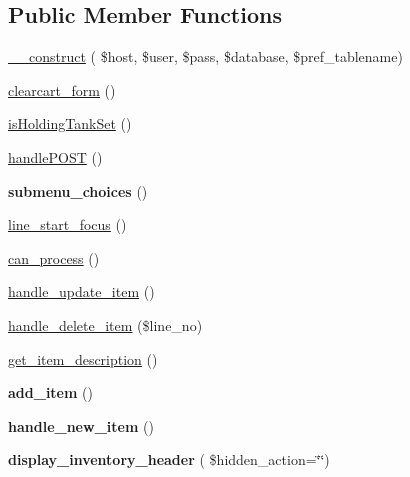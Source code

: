 \subsection*{Public Member Functions}
\begin{DoxyCompactItemize}
\item 
\hyperlink{class_inventory__ui_a903fc6b7eb51afa2c4f6c1392783973d}{\+\_\+\+\_\+construct} ( \$host, \$user, \$pass, \$database, \$pref\+\_\+tablename)
\item 
\hyperlink{class_inventory__ui_a107e020384575635892dd82bf07a5e46}{clearcart\+\_\+form} ()
\item 
\hyperlink{class_inventory__ui_aaa3f36bec8fb25199f697bf1983864aa}{is\+Holding\+Tank\+Set} ()
\item 
\hyperlink{class_inventory__ui_a0bdd5eda22187fd5ed67fc9b03edbbba}{handle\+P\+O\+ST} ()
\item 
\hypertarget{class_inventory__ui_ad89a4d653f5839e27c355aba1098aa8f}{}\label{class_inventory__ui_ad89a4d653f5839e27c355aba1098aa8f} 
{\bfseries submenu\+\_\+choices} ()
\item 
\hyperlink{class_inventory__ui_a5f2b542e69b9b6c8fe66d6ca513532f4}{line\+\_\+start\+\_\+focus} ()
\item 
\hyperlink{class_inventory__ui_ade75d16c1775ae3c2c40b3ac9ad6339f}{can\+\_\+process} ()
\item 
\hyperlink{class_inventory__ui_abd5a2b4048e33b9c1518db7c44115f4f}{handle\+\_\+update\+\_\+item} ()
\item 
\hyperlink{class_inventory__ui_aaa12492aec2f41782ca4467e2d0bb8c1}{handle\+\_\+delete\+\_\+item} (\$line\+\_\+no)
\item 
\hyperlink{class_inventory__ui_a37a17c8d4b2d63c774dc3404754df4f4}{get\+\_\+item\+\_\+description} ()
\item 
\hypertarget{class_inventory__ui_ab1eb2c3cdb2a43e6ff70b6ee5a0177e8}{}\label{class_inventory__ui_ab1eb2c3cdb2a43e6ff70b6ee5a0177e8} 
{\bfseries add\+\_\+item} ()
\item 
\hypertarget{class_inventory__ui_a180a927dec0a650428c79c80a55eb8a1}{}\label{class_inventory__ui_a180a927dec0a650428c79c80a55eb8a1} 
{\bfseries handle\+\_\+new\+\_\+item} ()
\item 
\hypertarget{class_inventory__ui_a7ab791c3e613331a41de68de9b5e7b63}{}\label{class_inventory__ui_a7ab791c3e613331a41de68de9b5e7b63} 
{\bfseries display\+\_\+inventory\+\_\+header} ( \$hidden\+\_\+action=\char`\"{}\char`\"{})
\item 
\hypertarget{class_inventory__ui_aa651f97c1b8cfc4a05ea091df4f0f0c8}{}\label{class_inventory__ui_aa651f97c1b8cfc4a05ea091df4f0f0c8} 

\end{DoxyCompactItemize}
